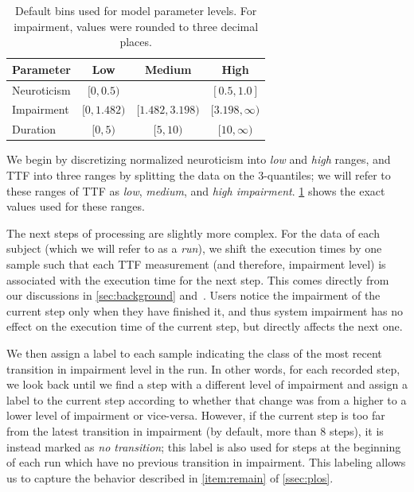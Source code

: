 \begin{table}[]
    \centering
    \caption{%
        Default bins used for model parameter levels.
        For impairment, values were rounded to three decimal places.
    }
    \label{tab:defaultbins}
    \begin{tabular}{@{}lccc@{}}
        \toprule
        \textbf{Parameter} & \textbf{Low}     & \textbf{Medium}      & \textbf{High}         \\ \midrule
        Neuroticism        & \( [0, 0.5) \)   &                      & \( [0.5, 1.0] \)      \\
        Impairment         & \( [0, 1.482) \) & \( [1.482, 3.198) \) & \( [3.198, \infty) \) \\
        Duration           & \( [0, 5) \)     & \( [5, 10) \)        & \( [10, \infty) \)    \\ \bottomrule
    \end{tabular}%
\end{table}

We begin by discretizing normalized neuroticism into \emph{low} and \emph{high} ranges, and \ac{TTF} into three ranges by splitting the data on the 3-quantiles; we will refer to these ranges of \ac{TTF} as \emph{low}, \emph{medium}, and \emph{high impairment}.
\cref{tab:defaultbins} shows the exact values used for these ranges.

The next steps of processing are slightly more complex.
For the data of each subject (which we will refer to as a \emph{run}), we shift the execution times by one sample such that each \ac{TTF} measurement (and therefore, impairment level) is associated with the execution time for the next step.
This comes directly from our discussions in \cref{sec:background} and~\cite{olguinmunoz:impact2021}.
Users notice the impairment of the current step only when they have finished it, and thus system impairment has no effect on the execution time of the current step, but directly affects the next one.

We then assign a label to each sample indicating the class of the most recent transition in impairment level in the run.
In other words, for each recorded step, we look back until we find a step with a different level of impairment and assign a label to the current step according to whether that change was from a higher to a lower level of impairment or vice-versa.
However, if the current step is too far from the latest transition in impairment (by default, more than \num{8} steps), it is instead marked as \emph{no transition}; this label is also used for steps at the beginning of each run which have no previous transition in impairment.
This labeling allows us to capture the behavior described in \cref{item:remain} of \cref{ssec:plos}.

